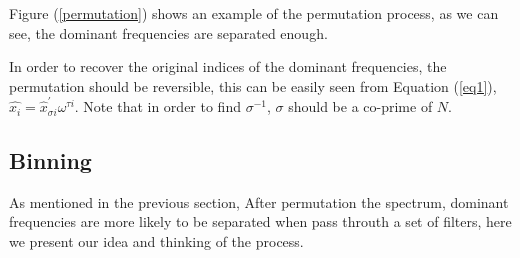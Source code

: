 \documentclass[journal,transmag]{IEEEtran}
\begin{document}
Figure (\ref{permutation})  shows an example of the permutation process, as we can see, the dominant frequencies are separated enough.

In order to recover the original indices of the dominant frequencies, the permutation should be reversible, this can be easily seen from Equation (\ref{eq1}), $\hat{x_{i}}=\hat{x}_{\sigma i}^{\prime}\omega^{\tau i}$. Note that in order to find $\sigma^{-1}$, $\sigma$ should be a co-prime of $N$.




\subsection{Binning}
As mentioned in the previous section, After permutation the spectrum, dominant frequencies are more likely to be separated when pass throuth a set of filters, here we present our idea and thinking of the process.
\end{document}
